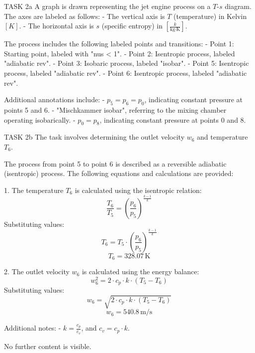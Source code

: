 TASK 2a  
A graph is drawn representing the jet engine process on a \( T \)-\( s \) diagram. The axes are labeled as follows:  
- The vertical axis is \( T \) (temperature) in Kelvin \([K]\).  
- The horizontal axis is \( s \) (specific entropy) in \([ \frac{k}{\text{kg} \cdot \text{K}} ]\).  

The process includes the following labeled points and transitions:  
- Point 1: Starting point, labeled with "nus < 1".  
- Point 2: Isentropic process, labeled "adiabatic rev".  
- Point 3: Isobaric process, labeled "isobar".  
- Point 5: Isentropic process, labeled "adiabatic rev".  
- Point 6: Isentropic process, labeled "adiabatic rev".  

Additional annotations include:  
- \( p_5 = p_6 = p_0 \), indicating constant pressure at points 5 and 6.  
- "Mischkammer isobar", referring to the mixing chamber operating isobarically.  
- \( p_0 = p_8 \), indicating constant pressure at points 0 and 8.  

TASK 2b  
The task involves determining the outlet velocity \( w_6 \) and temperature \( T_6 \).  

The process from point 5 to point 6 is described as a reversible adiabatic (isentropic) process. The following equations and calculations are provided:  

1. The temperature \( T_6 \) is calculated using the isentropic relation:  
\[
\frac{T_6}{T_5} = \left( \frac{p_6}{p_5} \right)^{\frac{k-1}{k}}
\]  
Substituting values:  
\[
T_6 = T_5 \cdot \left( \frac{p_6}{p_5} \right)^{\frac{k-1}{k}}
\]  
\[
T_6 = 328.07 \, \text{K}
\]  

2. The outlet velocity \( w_6 \) is calculated using the energy balance:  
\[
w_6^2 = 2 \cdot c_p \cdot k \cdot (T_5 - T_6)
\]  
Substituting values:  
\[
w_6 = \sqrt{2 \cdot c_p \cdot k \cdot (T_5 - T_6)}
\]  
\[
w_6 = 540.8 \, \text{m/s}
\]  

Additional notes:  
- \( k = \frac{c_p}{c_v} \), and \( c_v = c_p \cdot k \).  

No further content is visible.